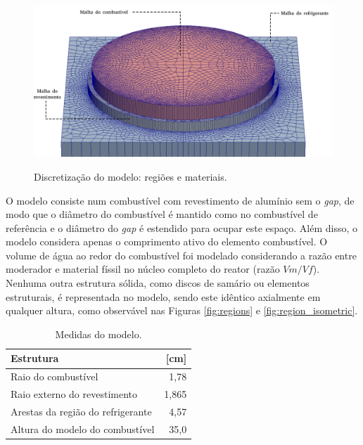 \begin{figure}[htb]
  \caption{Discretização do modelo: regiões e materiais.}
  \centering\includegraphics[scale=0.5]{figuras/regioes_edges_com_legenda_portugues.png}
  \label{fig:modelo_exploded}
\end{figure}

O modelo consiste num combustível com revestimento de alumínio sem
o \textit{gap}, de modo que o diâmetro do combustível é mantido como no
combustível de referência e o diâmetro do \textit{gap} é estendido para
ocupar este espaço. Além disso, o modelo considera apenas o comprimento
ativo do elemento combustível. O volume
de água ao redor do combustível foi modelado considerando a razão entre
moderador e material físsil no núcleo completo do reator (razão $Vm/Vf$). Nenhuma outra
estrutura sólida, como discos de samário ou elementos estruturais, é
representada no modelo, sendo este idêntico axialmente em qualquer
altura, como observável nas Figuras \ref{fig:regions} e \ref{fig:region_isometric}.

\begin{table}[htb]
  \centering
  \caption[Medidas do modelo.]{Medidas do modelo.}
  \label{tab:size_model}
  \begin{tabular}{lr}
    Estrutura                         & {[}cm{]} \\ \hline
    Raio do combustível               & 1,78     \\
    Raio externo do revestimento      & 1,865    \\
    Arestas da região do refrigerante & 4,57     \\ \hline
    Altura do modelo do combustível   & 35,0    
  \end{tabular}
\end{table}

